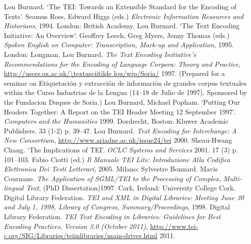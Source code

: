 \begin{bibitemlist}{1}
\label{Burnard1994}Lou Burnard. ‘The TEI: Towards an Extensible Standard for the Encoding of Texts’. Seamus Ross, Edward Higgs (eds.) \textit{Electronic Information Resources and Historians}, 1994. London: British Academy. 
\label{Burnard1995}Lou Burnard. ‘The Text Encoding Initiative: An Overview’. Geoffrey Leech, Greg Myers, Jenny Thomas (eds.) \textit{Spoken English on Computer: Transcription, Mark-up and Application}, 1995. London: Longman. 
\label{Burnard1997}Lou Burnard. \textit{The Text Encoding Initiative's Recommendations for the Encoding of Language Corpora: Theory and Practice},  \url{http://users.ox.ac.uk/\textasciitilde lou/wip/Soria/} 1997.  (Prepared for a seminar on Etiquetación y extracción de información de grandes corpus textuales within the Curso Industrias de la Lengua (14–18 de Julio de 1997). Sponsored by the Fundacion Duques de Soria.)
\label{BurnardandPopham1999}Lou Burnard, Michael Popham. ‘Putting Our Headers Together: A Report on the TEI Header Meeting 12 September 1997’.  \textit{Computers and the Humanities} 1999. Dordrecht, Boston: Kluwer Academic Publishers. 33  (1-2)  p. 39–47. 
\label{AB-eg-03}Lou Burnard. \textit{Text Encoding for Interchange: A New Consortium},  \url{http://www.ariadne.ac.uk/issue24/tei} 2000. 
\label{Chang2001}Sheau-Hwang Chang. ‘The Implications of TEI’. \textit{OCLC Systems and Services} 2001. 17  (3)  p. 101–103. 
\label{Ciottied2005}Fabio Ciotti (ed.) \textit{Il Manuale TEI Lite: Introduzione Alla Codifica Elettronica Dei Testi Letterari}, 2005. Milano: Sylvestre Bonnard. 
\label{Cournane1997}Mavis Cournane. \textit{The Application of SGML/TEI to the Processing of Complex, Multi-lingual Text},  (PhD Dissertation)1997. Cork, Ireland: University College Cork. 
\label{DigitalLibraryFederation1998}Digital Library Federation. \textit{TEI and XML in Digital Libraries: Meeting June 30 and July 1, 1998, Library of Congress, Summary/Proceedings}, 1998. 
\label{DigitalLibraryFederation2007}Digital Library Federation. \textit{TEI Text Encoding in Libraries: Guidelines for Best Encoding Practices}, \textit{Version 3.0 (October 2011)},  \url{http://www.tei-c.org/SIG/Libraries/teiinlibraries/main-driver.html} 2011. 

\end{bibitemlist}
